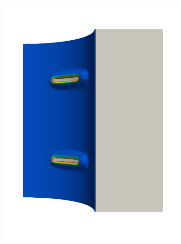 \begin{frame}
\begin{columns}[T]
\begin{column}{0.6\textwidth}
\begin{figure}
{\begin{subfigure}{0.19\textwidth}
            \includegraphics[width=\textwidth]{Chapter345/figures/seed_d_2}
          \end{subfigure}
          \hspace{0.06\textwidth}
          \begin{subfigure}{0.19\textwidth}
            \centering

\end{subfigure}}
\end{figure}
\end{column}
\end{columns}
\end{frame}
